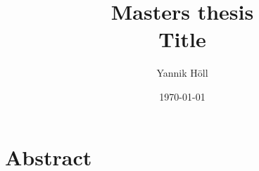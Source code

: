 \documentclass[a4paper, 12pt, twoside]{article}
\title{Masters thesis\\Title}
\author{Yannik Höll}
\date{\today}
\theoremstyle{break}
\theoremstyle{break}
\begin{document}
\begin{titlingpage}
    \maketitle
\end{titlingpage}

\tableofcontents
\pagebreak

\printnomenclature
\pagebreak

\nocite{*}

\section*{Abstract}






\appendix

\clearpage
\printbibliography
\end{document}
